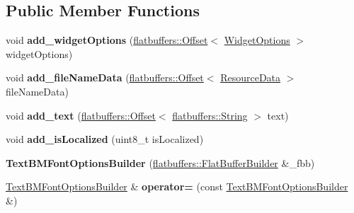 \subsection*{Public Member Functions}
\begin{DoxyCompactItemize}
\item 
\mbox{\label{structflatbuffers_1_1TextBMFontOptionsBuilder_a868d23cfdf4cfc29a43b8344d4104b51}} 
void {\bfseries add\+\_\+widget\+Options} (\hyperlink{structflatbuffers_1_1Offset}{flatbuffers\+::\+Offset}$<$ \hyperlink{structflatbuffers_1_1WidgetOptions}{Widget\+Options} $>$ widget\+Options)
\item 
\mbox{\label{structflatbuffers_1_1TextBMFontOptionsBuilder_a9174c38d85de8b17bb73844e9257aa87}} 
void {\bfseries add\+\_\+file\+Name\+Data} (\hyperlink{structflatbuffers_1_1Offset}{flatbuffers\+::\+Offset}$<$ \hyperlink{structflatbuffers_1_1ResourceData}{Resource\+Data} $>$ file\+Name\+Data)
\item 
\mbox{\label{structflatbuffers_1_1TextBMFontOptionsBuilder_a493b502ebde77016eb8b2f85ae9f3e99}} 
void {\bfseries add\+\_\+text} (\hyperlink{structflatbuffers_1_1Offset}{flatbuffers\+::\+Offset}$<$ \hyperlink{structflatbuffers_1_1String}{flatbuffers\+::\+String} $>$ text)
\item 
\mbox{\label{structflatbuffers_1_1TextBMFontOptionsBuilder_acab2a4c64962224265896dff8bfd91a8}} 
void {\bfseries add\+\_\+is\+Localized} (uint8\+\_\+t is\+Localized)
\item 
\mbox{\label{structflatbuffers_1_1TextBMFontOptionsBuilder_aeb9ef1010cab4fd370ab43ab18f341bb}} 
{\bfseries Text\+B\+M\+Font\+Options\+Builder} (\hyperlink{classflatbuffers_1_1FlatBufferBuilder}{flatbuffers\+::\+Flat\+Buffer\+Builder} \&\+\_\+fbb)
\item 
\mbox{\label{structflatbuffers_1_1TextBMFontOptionsBuilder_abcc6d6c3f6aa7c810f7c635c75112866}} 
\hyperlink{structflatbuffers_1_1TextBMFontOptionsBuilder}{Text\+B\+M\+Font\+Options\+Builder} \& {\bfseries operator=} (const \hyperlink{structflatbuffers_1_1TextBMFontOptionsBuilder}{Text\+B\+M\+Font\+Options\+Builder} \&)

\end{DoxyCompactItemize}
